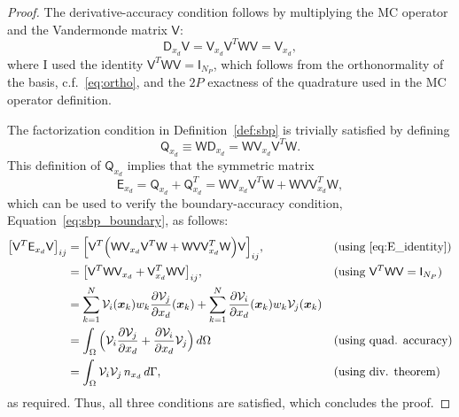 \documentclass[10pt,a4paper]{amsart}
\newcommand{\fnc}[1]{\ensuremath{\mathcal{#1}}}
\newcommand{\mat}[1]{\ensuremath{\mathsf{#1}}}
\begin{document}
\begin{proof}
The derivative-accuracy condition follows by multiplying the MC operator and the Vandermonde matrix $\mat{V}$:
\begin{equation*}
    \mat{D}_{x_d} \mat{V} = \mat{V}_{x_d} \mat{V}^T \mat{W} \mat{V}
     = \mat{V}_{x_d},
\end{equation*}
where I used the identity $\mat{V}^T \mat{W} \mat{V} = \mat{I}_{N_P}$, which follows from the orthonormality of the basis, c.f.~\eqref{eq:ortho}, and the $2P$ exactness of the quadrature used in the MC operator definition.

The factorization condition in Definition~\ref{def:sbp} is trivially satisfied by defining 
\begin{equation}\label{eq:Q_identity}
    \mat{Q}_{x_d} \equiv \mat{W} \mat{D}_{x_d} = \mat{W} \mat{V}_{x_d} \mat{V}^T \mat{W}.
\end{equation}
This definition of $\mat{Q}_{x_d}$ implies that the symmetric matrix 
\begin{equation}\label{eq:E_identity}
    \mat{E}_{x_d} = \mat{Q}_{x_d} + \mat{Q}_{x_d}^T
    = \mat{W} \mat{V}_{x_d} \mat{V}^T \mat{W} + \mat{W} \mat{V} \mat{V}_{x_d}^T \mat{W},
\end{equation}
which can be used to verify the boundary-accuracy condition, Equation~\eqref{eq:sbp_boundary}, as follows:
\begin{alignat*}{2}
\big[ \mat{V}^T \mat{E}_{x_d} \mat{V} \big]_{ij}
&= \Big[ \mat{V}^T \Big( \mat{W} \mat{V}_{x_d} \mat{V}^T \mat{W} + \mat{W} \mat{V} \mat{V}_{x_d}^T \mat{W} \Big) \mat{V} \Big]_{ij},\qquad& &\text{(using \eqref{eq:E_identity})} \\
&= \big[ \mat{V}^T \mat{W} \mat{V}_{x_d} + \mat{V}_{x_d}^T \mat{W} \mat{V} \big]_{ij}, & &\text{(using $\mat{V}^T \mat{W} \mat{V} = \mat{I}_{N_P}$)}\\
&= \sum_{k=1}^{N} \fnc{V}_i(\bm{x}_k) w_k \frac{\partial \fnc{V}_j}{\partial x_d}(\bm{x}_k) + \sum_{k=1}^{N} \frac{\partial \fnc{V}_i}{\partial x_d} (\bm{x}_k) w_k \fnc{V}_j (\bm{x}_k) && \\
&= \int_{\Omega} \Big( \fnc{V}_i \frac{\partial \fnc{V}_j}{\partial x_d} + \frac{\partial \fnc{V}_i}{\partial x_d} \fnc{V}_{j} \Big) \, d\Omega &&\text{(using quad. accuracy)}\\
&= \int_{\Omega} \fnc{V}_i \fnc{V}_j \, n_{x_d}\, d\Gamma, &&\text{(using div. theorem)}
\end{alignat*}
as required.  Thus, all three conditions are satisfied, which concludes the proof.
\end{proof}
\end{document}
